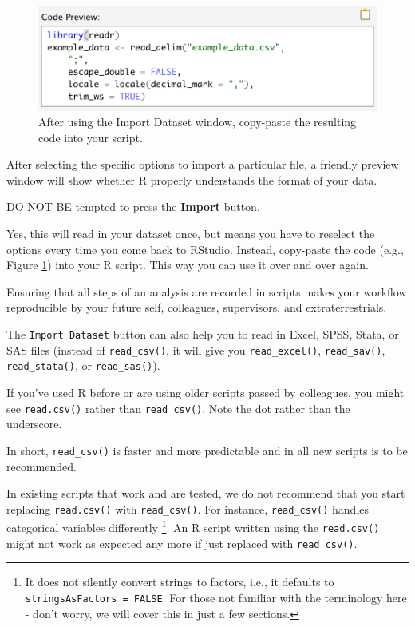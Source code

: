 \documentclass[
  12pt,
  krantz2]{krantz}
\renewenvironment{quote}{\begin{VF}}{\end{VF}}
\begin{document}
\begin{figure}

{\centering \includegraphics[width=0.5\linewidth]{images/chapter02/code_preview} 

}

\caption{After using the Import Dataset window, copy-paste the resulting code into your script.}\label{fig:chap02-fig-import-code}
\end{figure}

After selecting the specific options to import a particular file, a friendly preview window will show whether R properly understands the format of your data.

DO NOT BE tempted to press the \textbf{Import} button.

Yes, this will read in your dataset once, but means you have to reselect the options every time you come back to RStudio.
Instead, copy-paste the code (e.g., Figure \ref{fig:chap02-fig-import-code}) into your R script.
This way you can use it over and over again.

Ensuring that all steps of an analysis are recorded in scripts makes your workflow reproducible by your future self, colleagues, supervisors, and extraterrestrials.

\begin{quote}
The \texttt{Import\ Dataset} button can also help you to read in Excel, SPSS, Stata, or SAS files (instead of \texttt{read\_csv()}, it will give you \texttt{read\_excel()}, \texttt{read\_sav()}, \texttt{read\_stata()}, or \texttt{read\_sas()}).
\end{quote}

If you've used R before or are using older scripts passed by colleagues, you might see \texttt{read.csv()} rather than \texttt{read\_csv()}.
Note the dot rather than the underscore.

In short, \texttt{read\_csv()} is faster and more predictable and in all new scripts is to be recommended.

In existing scripts that work and are tested, we do not recommend that you start replacing \texttt{read.csv()} with \texttt{read\_csv()}.
For instance, \texttt{read\_csv()} handles categorical variables differently \footnote{It does not silently convert strings to factors, i.e., it defaults to \texttt{stringsAsFactors\ =\ FALSE}. For those not familiar with the terminology here - don't worry, we will cover this in just a few sections.}.
An R script written using the \texttt{read.csv()} might not work as expected any more if just replaced with \texttt{read\_csv()}.
\end{document}
